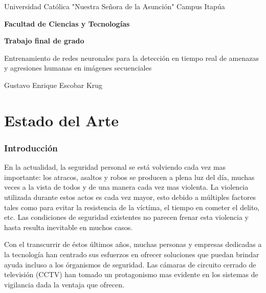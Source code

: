 \documentclass[a4paper,12pt,twoside]{article}
\begin{document}
	\begin{center}
		{\LARGE {Universidad Católica "Nuestra Señora de la Asunción" Campus Itapúa}}
	\end{center}
	\vspace*{0.1cm}
	\begin{center}
		{\large \rm \textbf {Facultad de Ciencias y Tecnologías}}
	\end{center}
	\vspace*{0.2cm}
	\begin{center}
		{\large \rm \textbf {Trabajo final de grado}}
	\end{center}		
	
	\baselineskip 30pt
	\vspace*{1cm}
	\begin{center}
		{\large \rm Entrenamiento de redes neuronales para la detección en tiempo real de amenazas y agresiones humanas en imágenes secuenciales}
	\end{center}

	\vspace*{1cm}

	\begin{center}
		{\sc  Gustavo Enrique Escobar Krug\\}
		\vspace*{0.1cm}
		
	\end{center}
	
	\pagebreak
	
	\baselineskip 16pt

	
\newpage
\setlength{\parskip}{1.3em}
\part{Estado del Arte}
\section{Introducción}
En la actualidad, la seguridad personal se está volviendo cada vez mas importante: los atracos, asaltos y robos se producen a plena luz del día, muchas veces a la vista de todos y de una manera cada vez mas violenta. La violencia utilizada durante estos actos es cada vez mayor, esto debido a múltiples factores tales como para evitar la resistencia de la víctíma, el tiempo en cometer el delito, etc. Las condiciones de seguridad existentes no parecen frenar esta violencia y hasta resulta inevitable en muchos casos. \par
Con el transcurrir de éstos últimos años, muchas personas y empresas dedicadas a la tecnología han centrado sus esfuerzos en ofrecer soluciones que puedan brindar ayuda incluso a los órganismos de seguridad. Las cámaras de circuito cerrado de televisión (CCTV) han tomado un protagonismo mas evidente en los sistemas de vigilancia dada la ventaja que ofrecen. \par
\end{document}
